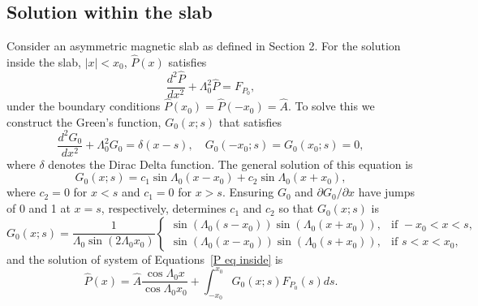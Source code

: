 \documentclass{aastex61}
\begin{document}
\subsection{Solution within the slab}
Consider an asymmetric magnetic slab as defined in Section 2. For the solution inside the slab, $|x| < x_0$, $\hat{P}(x)$ satisfies
\begin{equation}
\frac{d^2\hat{P}}{dx^2} + \Lambda_0^2 \hat{P} = F_{P_0},
\end{equation}
under the boundary conditions $\hat{P}(x_0) = \hat{P}(-x_0) = \hat{A}$. To solve this we construct the Green's function, $G_0(x;s)$ that satisfies
\begin{equation}
\frac{d^2G_0}{dx^2} + \Lambda_0^2 G_0 = \delta(x-s), \quad G_0(-x_0;s) = G_0(x_0;s) = 0,
\label{P eq inside}
\end{equation}
where $\delta$ denotes the Dirac Delta function. The general solution of this equation is
\begin{equation}
G_0(x;s) = c_1\sin{\Lambda_0(x - x_0)} + c_2\sin{\Lambda_0(x + x_0)},
\end{equation}
where $c_2 = 0$ for $x < s$ and $c_1 = 0$ for $x > s$. Ensuring $G_0$ and $\partial G_0 / \partial x$ have jumps of 0 and 1 at $x = s$, respectively, determines $c_1$ and $c_2$ so that $G_0(x;s)$ is
\begin{equation}
G_0(x;s) = \frac{1}{\Lambda_0\sin(2\Lambda_0 x_0)}
\begin{cases}
\sin(\Lambda_0(s - x_0))\sin(\Lambda_0(x + x_0)), & \text{if } -x_0<x<s, \\
\sin(\Lambda_0(x - x_0))\sin(\Lambda_0(s + x_0)), & \text{if } s<x<x_0,
\end{cases}
\end{equation}
and the solution of system of Equations~\eqref{P eq inside} is
\begin{equation}
\hat{P}(x) = \hat{A}\frac{\cos{\Lambda_0x}}{\cos{\Lambda_0x_0}} + \int_{-x_0}^{x_0} G_0(x;s) F_{P_0}(s) ds.
\end{equation}
\end{document}
